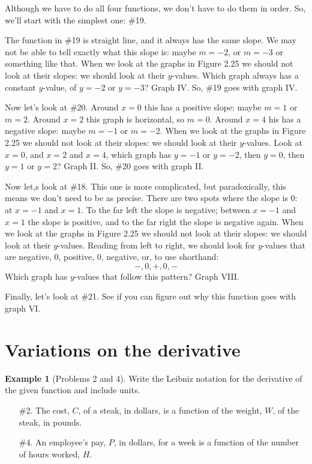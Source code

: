 \documentclass[oneside]{book}
\theoremstyle{definition}
\newtheorem{example}{Example}
\theoremstyle{solution}
\newtheorem*{solution}{Solution}
\newenvironment{solution}{\vspace{2in}\comment}{\endcomment}
\begin{document}
\begin{solution}
Although we have to do all four functions, we don't have to do them
in order.  So, we'll start with the simplest one: \#19.

The function in \#19 is straight line, and it always has the same
slope.  We may not be able to tell exactly what this slope is: maybe
$m=-2$, or $m=-3$ or something like that.  When we look at the graphs
in Figure 2.25 we should not look at their slopes: we should look at
their $y$-values.  Which graph always has a constant $y$-value, of
$y=-2$ or $y=-3$?  Graph IV.  So, \#19 goes with graph IV.

Now let's look at \#20.  Around $x=0$ this has a positive slope: maybe
$m=1$ or $m=2$.  Around $x=2$ this graph is horizontal, so $m=0$.
Around $x=4$ his has a negative slope: maybe $m=-1$ or $m=-2$.  When
we look at the graphs in Figure 2.25 we should not look at their
slopes: we should look at their $y$-values.  Look at $x=0$, and $x=2$
and $x=4$, which graph has $y=-1$ or $y=-2$, then $y=0$, then $y=1$ or
$y=2$?  Graph II.  So, \#20 goes with graph II.

Now let,s look at \#18.  This one is more complicated, but
paradoxically, this means we don't need to be as precise.  There are
two spots where the slope is $0$: at $x=-1$ and $x=1$.  To the far
left the slope is negative; between $x=-1$ and $x=1$ the slope is
positive, and to the far right the slope is negative again.  When we
look at the graphs in Figure 2.25 we should not look at their slopes:
we should look at their $y$-values.  Reading from left to right, we
should look for $y$-values that are negative, $0$, positive, $0$, 
negative, or, to use shorthand:
$$
-, 0, +, 0, -
$$
Which graph has $y$-values that follow this pattern?  Graph VIII.

Finally, let's look at \#21.  See if you can figure out why this
function goes with graph VI.  
\end{solution}

\section{Variations on the derivative}

\begin{example}[Problems 2 and 4]
Write the Leibniz notation for the derivative of the given function
and include units.

\begin{enumerate}
\item[\#2.] The cost, $C$, of a steak, in dollars, is a function of
  the weight, $W$, of the steak, in pounds.

\item[\#4.] An employee's pay, $P$, in dollars, for a week is a
  function of the number of hours worked, $H$.
\end{enumerate}
\end{example}
\end{document}
